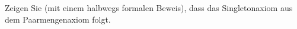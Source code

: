 
\begin{exercise}[254]

Zeigen Sie (mit einem halbwegs formalen Beweis), dass das Singletonaxiom
aus dem Paarmengenaxiom folgt.

\end{exercise}


\begin{solution}

\phantom{}

\end{solution}
